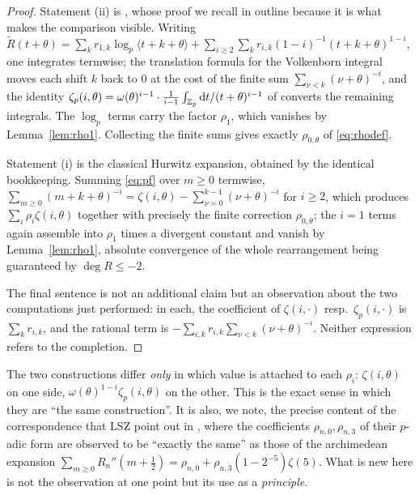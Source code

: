 \begin{proof}
Statement (ii) is \cite[Lemma 21]{LaiSprang2023}, whose proof we recall in outline because
it is what makes the comparison visible. Writing
$\widetilde R(t+\theta)=\sum_kr_{1,k}\log_p\langle t+k+\theta\rangle
 +\sum_{i\ge2}\sum_k r_{i,k}(1-i)^{-1}(t+k+\theta)^{1-i}$, one integrates termwise; the
translation formula for the Volkenborn integral \cite[Lemma 5]{LSZ2025} moves each shift
$k$ back to $0$ at the cost of the finite sum $\sum_{\nu<k}(\nu+\theta)^{-i}$, and the
identity $\zeta_p(i,\theta)=\omega(\theta)^{i-1}\cdot\frac{1}{i-1}\int_{\mathbb{Z}_p}
 \mathrm{d} t/(t+\theta)^{i-1}$ of \cite[\S2]{LaiSprang2023} converts the remaining integrals. The
$\log_p$ terms carry the factor $\rho_1$, which vanishes by Lemma~\ref{lem:rho1}. Collecting
the finite sums gives exactly $\rho_{0,\theta}$ of \eqref{eq:rhodef}.

Statement (i) is the classical Hurwitz expansion, obtained by the identical bookkeeping.
Summing \eqref{eq:pf} over $m\ge0$ termwise,
$\sum_{m\ge0}(m+k+\theta)^{-i}=\zeta(i,\theta)-\sum_{\nu=0}^{k-1}(\nu+\theta)^{-i}$ for
$i\ge2$, which produces $\sum_i\rho_i\zeta(i,\theta)$ together with precisely the finite
correction $\rho_{0,\theta}$; the $i=1$ terms again assemble into $\rho_1$ times a divergent
constant and vanish by Lemma~\ref{lem:rho1}, absolute convergence of the whole rearrangement
being guaranteed by $\deg R\le-2$.

The final sentence is not an additional claim but an observation about the two computations
just performed: in each, the coefficient of $\zeta(i,\cdot)$ resp.\ $\zeta_p(i,\cdot)$ is
$\sum_kr_{i,k}$, and the rational term is $-\sum_{i,k}r_{i,k}\sum_{\nu<k}(\nu+\theta)^{-i}$.
Neither expression refers to the completion.
\end{proof}

\begin{remark}\label{rem:sameness}
The two constructions differ \emph{only} in which value is attached to each $\rho_i$:
$\zeta(i,\theta)$ on one side, $\omega(\theta)^{1-i}\zeta_p(i,\theta)$ on the other. This is
the exact sense in which they are ``the same construction''. It is also, we note, the
precise content of the correspondence that LSZ point out in
\cite[Remark 13]{LSZ2025}, where the coefficients $\rho_{n,0},\rho_{n,3}$ of their $p$-adic
form are observed to be ``exactly the same'' as those of the archimedean expansion
$\sum_{m\ge0}R_n''(m+\tfrac12)=\rho_{n,0}+\rho_{n,3}(1-2^{-5})\zeta(5)$. What is new here is
not the observation at one point but its use as a \emph{principle}.
\end{remark}

